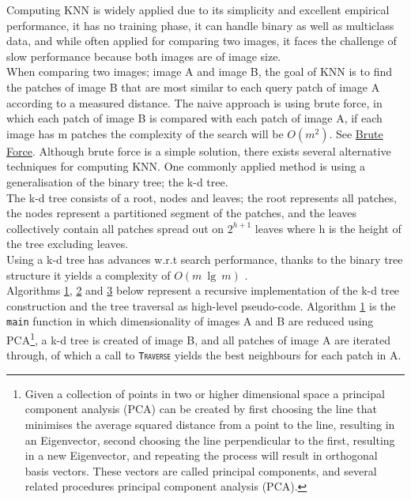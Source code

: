 Computing KNN is widely applied due to its simplicity and excellent empirical performance, it has no training phase, it can handle binary as well as multiclass data, and while often applied for comparing two images, it faces the challenge of slow performance because both images are of image size. 
\\[2mm]
When comparing two images; image A and image B, the goal of KNN is to find the patches of image B that are most similar to each query patch of image A according to a measured distance. The naive approach is using brute force, in which each patch of image B is compared with each patch of image A, if each image has m patches the complexity of the search will be $O(m^2)$. See \hyperref[sec:brute]{Brute Force}. Although brute force is a simple solution, there exists several alternative techniques for computing KNN. One commonly applied method is using a generalisation of the binary tree; the k-d tree. 
\\[2mm]
The k-d tree consists of a root, nodes and leaves; the root represents all patches, the nodes represent a partitioned segment of the patches, and the leaves collectively contain all patches spread out on $2^{h+1}$ leaves where h is the height of the tree excluding leaves.
\\[2mm]
Using a k-d tree has advances w.r.t search performance, thanks to the binary tree structure it yields a complexity of $O(m\ \lg\ m)$ \cite{logmatches}.
\\[2mm]
Algorithms \hyperref[alg:main]{1}, \hyperref[alg:tree]{2} and \hyperref[alg:traverse]{3} below represent a recursive implementation of the k-d tree construction and the tree traversal as high-level pseudo-code. 
Algorithm \hyperref[alg:main]{1} is the \texttt{main} function in which dimensionality of images A and B are reduced using PCA\footnote{Given a collection of points in two or higher dimensional space a principal component analysis (PCA) can be created by first choosing the line that minimises the average squared distance from a point to the line, resulting in an Eigenvector, second choosing the line perpendicular to the first, resulting in a new Eigenvector, and repeating the process will result in orthogonal basis vectors. These vectors are called principal components, and several related procedures principal component analysis (PCA).}, a k-d tree is created of image B, and all patches of image A are iterated through, of which a call to \texttt{\textsc{Traverse}} yields the best neighbours for each patch in A. 


